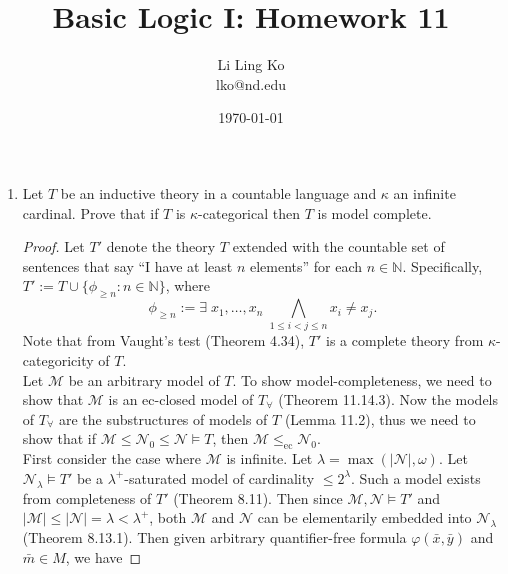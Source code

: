 \documentclass{article}
\begin{document}
\title{Basic Logic I: Homework 11}
\author{Li Ling Ko\\ lko@nd.edu}
\date{\today}
\maketitle

\begin{enumerate}[label={\bf Q\arabic*:}]
  \item Let $T$ be an inductive theory in a countable language and $\kappa$
    an infinite cardinal. Prove that if $T$ is $\kappa$-categorical then
    $T$ is model complete.

    \begin{proof}
      Let $T'$ denote the theory $T$ extended with the countable set of
      sentences that say ``I have at least $n$ elements'' for each
      $n\in\mathbb{N}$. Specifically, $T':=T\cup\{\phi_{\geq
      n}:n\in\mathbb{N}\}$, where
      \[\phi_{\geq n}:= \exists\; x_1,\ldots,x_n\; \bigwedge_{1\leq
        i<j\leq n} x_i\neq x_j.\]
      Note that from Vaught's test (Theorem 4.34), $T'$
      is a complete theory from $\kappa$-categoricity of $T$. \\

      Let $\mathcal{M}$ be an arbitrary model of $T$. To show
      model-completeness, we need to show that $\mathcal{M}$ is an
      ec-closed model of $T_\forall$ (Theorem 11.14.3). Now the models of
      $T_\forall$ are the substructures of models of $T$ (Lemma 11.2), thus
      we need to show that if $\mathcal{M}\leq
      \mathcal{N}_0\leq\mathcal{N}\models T$,
      then $\mathcal{M}\leq_{\text{ec}}\mathcal{N}_0$. \\

      First consider the case where $\mathcal{M}$ is infinite. Let
      $\lambda=\max(|\mathcal{N}|,\omega)$. Let $\mathcal{N}_\lambda\models
      T'$ be a $\lambda^+$-saturated model of cardinality $\leq2^\lambda$.
      Such a model exists from completeness of $T'$ (Theorem 8.11). Then
      since $\mathcal{M},\mathcal{N}\models T'$ and
      $|\mathcal{M}|\leq|\mathcal{N}|=\lambda<\lambda^+$, both
      $\mathcal{M}$ and $\mathcal{N}$ can be elementarily embedded into
      $\mathcal{N}_\lambda$ (Theorem 8.13.1). Then given arbitrary
      quantifier-free formula $\varphi(\bar{x},\bar{y})$ and $\bar{m}\in
      M$, we have


\end{proof}
\end{enumerate}
\end{document}
